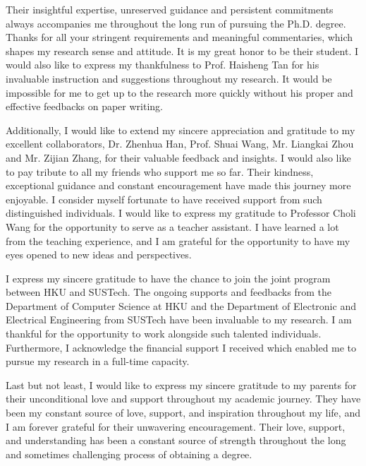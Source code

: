 
%
Their insightful expertise, unreserved guidance and persistent commitments always accompanies me throughout the long run of pursuing the Ph.D. degree.
Thanks for all your stringent requirements and meaningful commentaries, which shapes my research sense and attitude.
It is my great honor to be their student.
I would also like to express my thankfulness to Prof. Haisheng Tan for his invaluable instruction and suggestions throughout my research.
It would be impossible for me to get up to the research more quickly without his proper and effective feedbacks on paper writing.

Additionally, I would like to extend my sincere appreciation and gratitude to my excellent collaborators, Dr. Zhenhua Han, Prof. Shuai Wang, Mr. Liangkai Zhou and Mr. Zijian Zhang, for their valuable feedback and insights.
I would also like to pay tribute to all my friends who support me so far.
Their kindness, exceptional guidance and constant encouragement have made this journey more enjoyable.
I consider myself fortunate to have received support from such distinguished individuals.
I would like to express my gratitude to Professor Choli Wang for the opportunity to serve as a teacher assistant.
I have learned a lot from the teaching experience, and I am grateful for the opportunity to have my eyes opened to new ideas and perspectives.

I express my sincere gratitude to have the chance to join the joint program between HKU and SUSTech.
The ongoing supports and feedbacks from the Department of Computer Science at HKU and the Department of Electronic and Electrical Engineering from SUSTech have been invaluable to my research. I am thankful for the opportunity to work alongside such talented individuals.
Furthermore, I acknowledge the financial support I received which enabled me to pursue my research in a full-time capacity.

Last but not least, I would like to express my sincere gratitude to my parents for their unconditional love and support throughout my academic journey.
They have been my constant source of love, support, and inspiration throughout my life, and I am forever grateful for their unwavering encouragement.
Their love, support, and understanding has been a constant source of strength throughout the long and sometimes challenging process of obtaining a degree.

